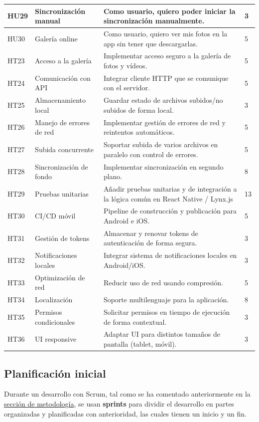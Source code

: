 \begin{tabularx}{\textwidth}{|l|l|>{\raggedright\arraybackslash}X|l|}
    \hline
    HU29 & Sincronización manual & Como usuario, quiero poder iniciar la sincronización manualmente. & 3 \\
    \hline
    HU30 & Galería online & Como usuario, quiero ver mis fotos en la app sin tener que descargarlas. & 5 \\
    \hline
    HT23 & Acceso a la galería & Implementar acceso seguro a la galería de fotos y vídeos. & 5 \\
    \hline
    HT24 & Comunicación con API & Integrar cliente HTTP que se comunique con el servidor. & 5 \\
    \hline
    HT25 & Almacenamiento local & Guardar estado de archivos subidos/no subidos de forma local. & 3 \\
    \hline
    HT26 & Manejo de errores de red & Implementar gestión de errores de red y reintentos automáticos. & 5 \\
    \hline
    HT27 & Subida concurrente & Soportar subida de varios archivos en paralelo con control de errores. & 5 \\
    \hline
    HT28 & Sincronización de fondo & Implementar sincronización en segundo plano. & 8 \\
    \hline
    HT29 & Pruebas unitarias & Añadir pruebas unitarias y de integración a la lógica común en React Native / Lynx.js & 13 \\
    \hline
    HT30 & CI/CD móvil & Pipeline de construcción y publicación para Android e iOS. & 5 \\
    \hline
    HT31 & Gestión de tokens & Almacenar y renovar tokens de autenticación de forma segura. & 3 \\
    \hline
    HT32 & Notificaciones locales & Integrar sistema de notificaciones locales en Android/iOS. & 3 \\
    \hline
    HT33 & Optimización de red & Reducir uso de red usando compresión. & 5 \\
    \hline
    HT34 & Localización & Soporte multilenguaje para la aplicación. & 8 \\
    \hline
    HT35 & Permisos condicionales & Solicitar permisos en tiempo de ejecución de forma contextual. & 3 \\
    \hline
    HT36 & UI responsive & Adaptar UI para distintos tamaños de pantalla (tablet, móvil). & 3 \\
    \hline
\end{tabularx}

\subsection{Planificación inicial}
\label{sec:planificacion-inicial}
Durante un desarrollo con Scrum, tal como se ha comentado anteriormente en la \hyperref[sec:metodologia]{sección de metodología}, se usan \textbf{sprints} para dividir el desarrollo en partes organizadas y planificadas con anterioridad, las cuales tienen un inicio y un fin.

